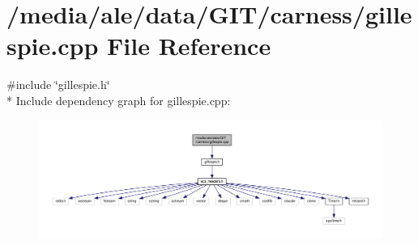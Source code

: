 \hypertarget{a00073}{\section{/media/ale/data/\-G\-I\-T/carness/gillespie.cpp File Reference}
\label{a00073}
}
{\ttfamily \#include \char`\"{}gillespie.\-h\char`\"{}}\\*
Include dependency graph for gillespie.\-cpp\-:\nopagebreak
\begin{figure}[H]
\begin{center}
\leavevmode
\includegraphics[width=350pt]{a00142}
\end{center}
\end{figure}
